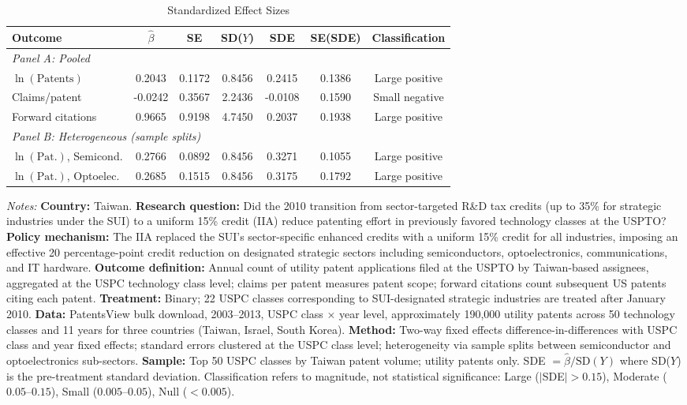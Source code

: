 \begin{table}[htbp]
\centering
\caption{Standardized Effect Sizes}
\label{tab:sde}
\begin{tabular}{lcccccc}
\toprule
Outcome & $\hat{\beta}$ & SE & SD($Y$) & SDE & SE(SDE) & Classification \\
\midrule
\multicolumn{7}{l}{\textit{Panel A: Pooled}} \\[3pt]
$\ln(\text{Patents})$ & 0.2043 & 0.1172 & 0.8456 & 0.2415 & 0.1386 & Large positive \\
Claims/patent & -0.0242 & 0.3567 & 2.2436 & -0.0108 & 0.1590 & Small negative \\
Forward citations & 0.9665 & 0.9198 & 4.7450 & 0.2037 & 0.1938 & Large positive \\
\midrule
\multicolumn{7}{l}{\textit{Panel B: Heterogeneous (sample splits)}} \\[3pt]
$\ln(\text{Pat.})$, Semicond. & 0.2766 & 0.0892 & 0.8456 & 0.3271 & 0.1055 & Large positive \\
$\ln(\text{Pat.})$, Optoelec. & 0.2685 & 0.1515 & 0.8456 & 0.3175 & 0.1792 & Large positive \\
\bottomrule
\end{tabular}
\begin{tablenotes}
\small
\item \textit{Notes:} \textbf{Country:} Taiwan. \textbf{Research question:} Did the 2010 transition from sector-targeted R\&D tax credits (up to 35\% for strategic industries under the SUI) to a uniform 15\% credit (IIA) reduce patenting effort in previously favored technology classes at the USPTO? \textbf{Policy mechanism:} The IIA replaced the SUI's sector-specific enhanced credits with a uniform 15\% credit for all industries, imposing an effective 20 percentage-point credit reduction on designated strategic sectors including semiconductors, optoelectronics, communications, and IT hardware. \textbf{Outcome definition:} Annual count of utility patent applications filed at the USPTO by Taiwan-based assignees, aggregated at the USPC technology class level; claims per patent measures patent scope; forward citations count subsequent US patents citing each patent. \textbf{Treatment:} Binary; 22 USPC classes corresponding to SUI-designated strategic industries are treated after January 2010. \textbf{Data:} PatentsView bulk download, 2003--2013, USPC class $\times$ year level, approximately 190,000 utility patents across 50 technology classes and 11 years for three countries (Taiwan, Israel, South Korea). \textbf{Method:} Two-way fixed effects difference-in-differences with USPC class and year fixed effects; standard errors clustered at the USPC class level; heterogeneity via sample splits between semiconductor and optoelectronics sub-sectors. \textbf{Sample:} Top 50 USPC classes by Taiwan patent volume; utility patents only. SDE $= \hat{\beta} / \text{SD}(Y)$ where SD($Y$) is the pre-treatment standard deviation. Classification refers to magnitude, not statistical significance: Large ($|$SDE$| > 0.15$), Moderate ($0.05$--$0.15$), Small ($0.005$--$0.05$), Null ($< 0.005$).
\end{tablenotes}
\end{table}
